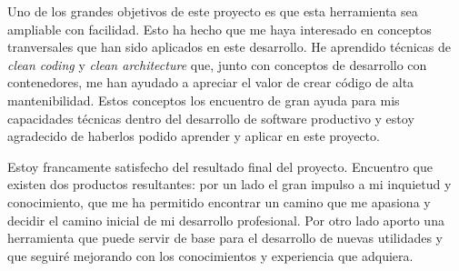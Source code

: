 Uno de los grandes objetivos de este proyecto es que esta herramienta sea ampliable con facilidad. Esto ha hecho que me haya interesado en conceptos tranversales que han sido aplicados en este desarrollo. He aprendido técnicas de \textit{clean coding} y \textit{clean architecture} que, junto con conceptos de desarrollo con contenedores, me han ayudado a apreciar el valor de crear código de alta mantenibilidad. Estos conceptos los encuentro de gran ayuda para mis capacidades técnicas dentro del desarrollo de software productivo y estoy agradecido de haberlos podido aprender y aplicar en este proyecto.

Estoy francamente satisfecho del resultado final del proyecto. Encuentro que existen dos productos resultantes: por un lado el gran impulso a mi inquietud y conocimiento, que me ha permitido encontrar un camino que me apasiona y decidir el camino inicial de mi desarrollo profesional. Por otro lado aporto una herramienta que puede servir de base para el desarrollo de nuevas utilidades y que seguiré mejorando con los conocimientos y experiencia que adquiera.





